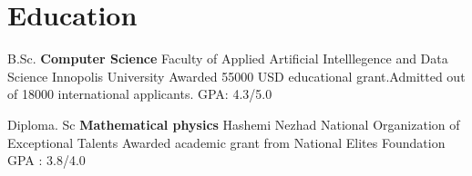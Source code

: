\section{Education}
    \cventry{}
            {B.Sc. \textbf{Computer Science}}
            {Faculty of Applied Artificial Intelllegence and Data Science}
            {Innopolis University}
            {Awarded 55000 USD educational grant.Admitted out of 18000 international applicants.}
            {GPA: 4.3/5.0} 
  
    \vspace{10pt}
    
    \cventry{}
            {Diploma. Sc \textbf{Mathematical physics}}
            {Hashemi Nezhad}
            {National Organization of Exceptional Talents}
            {Awarded academic grant from National Elites Foundation }
            {GPA : 3.8/4.0}